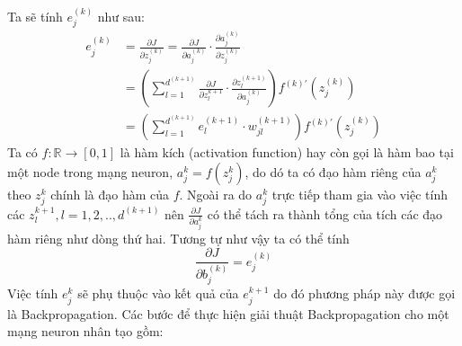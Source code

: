 Ta sẽ tính $e_{j}^{(k)}$ như sau:
\begin{align*}
	{e_{j}^{(k)}}
	&=
	{\frac
		{ {\partial} J }
		{ {\partial} {z_{j}^{(k)}} }
	}
	=
	{\frac
		{ {\partial} J }
		{ {\partial} {a_{j}^{(k)}} }
	}
	{\cdot}
	{\frac
		{ {\partial} {a_{j}^{(k)}} }
		{ {\partial} {z_{j}^{(k)}} }
	} \\
	&=\left( 
			 {\sum_{l=1}^{d^{(k+1)}}} 
			 {\frac
			 	{ {\partial} J }
			 	{ {\partial} {z_{l}^{k+1}} } 
			 }
			 {\cdot}
			 {\frac
			 	{ {\partial} {z_{l}^{(k+1)}} }
			 	{ {\partial} {a_{j}^{(k)}} } 
			 }
		\right) 
		{
			{f^{(k)'}} \left( 
					{z_{j}^{(k)}} 
				 \right)
		} \\
	&=\left( 
			 {\sum_{l=1}^{d^{(k+1)}}} 
			 e_{l}^{(k+1)}
			 {\cdot}
			 w_{jl}^{(k+1)}
		\right) 
		{
			{f^{(k)'}} \left( 
					{z_{j}^{(k)}} 
				 \right)
		}
\end{align*}
Ta có $f:{\mathbb{R}}{\rightarrow}[0,1]$ là hàm kích (activation function) hay còn gọi là hàm bao tại một node trong mạng neuron, $a_{j}^{k}=f\left(z_{j}^{k}\right)$, do dó ta có đạo hàm riêng của $a_{j}^{k}$ theo $z_{j}^{k}$ chính là đạo hàm của $f$. Ngoài ra do $a_{j}^{k}$ trực tiếp tham gia vào việc tính các $z_{l}^{k+1},l=1,2,..,d^{(k+1)}$ nên ${\frac{{\partial}J}{{\partial}{a_{j}^{k}}}}$ có thể tách ra thành tổng của tích các đạo hàm riêng như dòng thứ hai. Tương tự như vậy ta có thể tính
\begin{equation}
	\frac
		{ {\partial} J }
		{ {\partial} {b_{j}^{(k)}} }
	= {e_{j}^{(k)}}
\end{equation}
Việc tính ${e_{j}^{k}}$ sẽ phụ thuộc vào kết quả của ${e_{j}^{k+1}}$ do đó phương pháp này được gọi là Backpropagation.
Các bước để thực hiện giải thuật Backpropagation cho một mạng neuron nhân tạo gồm:
